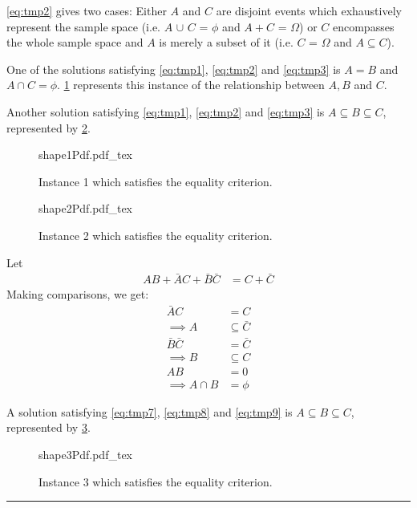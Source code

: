\begin{enumerate}[a.]
		\cref{eq:tmp2} gives two cases: Either $A$ and $C$ are disjoint events which exhaustively represent the sample space (i.e. $A$ $\cup$ $C$ = $\phi$ and $A+C$ = $\Omega$) or $C$ encompasses the whole sample space and $A$ is merely a subset of it (i.e. $C$ = $\Omega$ and $A \subseteq C$).
		
		One of the solutions satisfying \cref{eq:tmp1}, \cref{eq:tmp2} and \cref{eq:tmp3} is $A = B$ and $A \cap C = \phi$. \cref{fig:shape1} represents this instance of the relationship between $A, B$ and $C$.
		
		Another solution satisfying \cref{eq:tmp1}, \cref{eq:tmp2} and \cref{eq:tmp3} is $A \subseteq B \subseteq C$, represented by \cref{fig:shape2}.
		
		\begin{figure}[h]
			\centering
			{shape1Pdf.pdf_tex}
			\caption{Instance 1 which satisfies the equality criterion.}
			\label{fig:shape1}
		\end{figure}
		
		\begin{figure}[h]
			\centering
			{shape2Pdf.pdf_tex}
			\caption{Instance 2 which satisfies the equality criterion.}
			\label{fig:shape2}
		\end{figure}
	
		Let\\[-20pt]
		\begin{align}
			AB + \bar{A}C + \bar{B}\bar{C} &= C + \bar{C}
		\end{align}
		Making comparisons, we get:
		\begin{align}
			\bar{A}C &= C \nonumber\\
			\implies A &\subseteq \bar{C} \label{eq:tmp7}\\
			\bar{B}\bar{C} &= \bar{C} \nonumber\\
			\implies B &\subseteq C \label{eq:tmp8}\\
			AB &= 0 \nonumber\\
			\implies A \cap B &= \phi \label{eq:tmp9}
		\end{align}
		
		A solution satisfying \cref{eq:tmp7}, \cref{eq:tmp8} and \cref{eq:tmp9} is $A \subseteq B \subseteq C$, represented by \cref{fig:shape3}.
		
		\begin{figure}[h]
			\centering
			{shape3Pdf.pdf_tex}
			\caption{Instance 3 which satisfies the equality criterion.}
			\label{fig:shape3}
		\end{figure}
\end{enumerate}

\noindent\rule{\textwidth}{1pt}